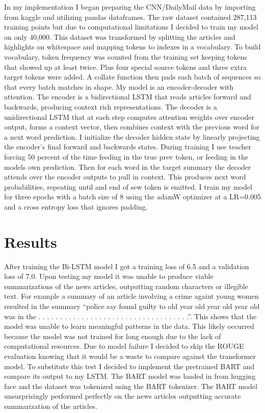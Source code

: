 \documentclass[11pt,a4paper]{article}
\begin{document}
In my implementation I began preparing the CNN/DailyMail data by importing from kaggle and utilizing pandas dataframes. The raw dataset contained 287,113 training points but due to computational limitations I decided to train my model on only 40,000. This dataset was transformed by splitting the articles and highlights on whitespace and mapping tokens to indexes in a vocabulary. To build vocabulary, token frequency was counted from the training set keeping tokens that showed up at least twice. Plus four special source tokens and three extra target tokens were added. A collate function then pads each batch of sequences so that every batch matches in shape. 
My model is an encoder-decoder with attention. The encoder is a bidirectional LSTM that reads articles forward and backwards, producing context rich representations. The decoder is a unidirectional LSTM that at each step computes attention weights over encoder output, forms a context vector, then combines context with the previous word for a next word prediction. I initialize the decoder hidden state by linearly projecting the encoder's final forward and backwards states. During training I use teacher forcing 50 percent of the time feeding in the true prev token, or feeding in the models own prediction. 
Then for each word in the target summary the decoder attends over the encoder outputs to pull in context. This produces next word probabilities, repeating until and end of sew token is emitted. I train my model for three epochs with a batch size of 8 using the adamW optimizer at a LR=0.005 and a cross entropy loss that ignores padding.


\section{Results}

After training the Bi-LSTM model I got a training loss of 6.5 and a validation loss of 7.0. Upon testing my model it was unable to produce viable summarizations of the news articles, outputting random characters or illegible text. For example a summary of an article involving a crime againt young women resulted in the summary “police say found guilty to old year old year old year old was in the . . . . . . . . . . . . . . . . . . . . . . . . . . . . . . . . . . .”. This shows that the model was unable to learn meaningful patterns in the data. This likely occurred because the model was not trained for long enough due to the lack of computational resources. Due to model failure I decided to skip the ROUGE evaluation knowing that it would be a waste to compare against the transformer model. To substitute this test I decided to implement the pretrained BART and compare its output to my LSTM. The BART model was loaded in from hugging face and the dataset was tokenized using the BART tokenizer. The BART model unsurprisingly performed perfectly on the news articles outputting accurate summarization of the articles.
\end{document}

